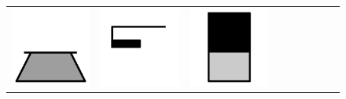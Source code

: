 \documentclass[doc]{apa6}
\newcommand{\stimulusscale}{.1}
\begin{document}
\begin{figure}[t]
\begin{center}
\begin{tabular}{c|cccccccc}
\includegraphics[scale=\stimulusscale]{./set25stim75.png} &
\includegraphics[scale=\stimulusscale]{./set26stim75.png} &
\includegraphics[scale=\stimulusscale]{./set27stim75.png} &

\end{tabular}
\end{center}
\end{figure}
\end{document}
